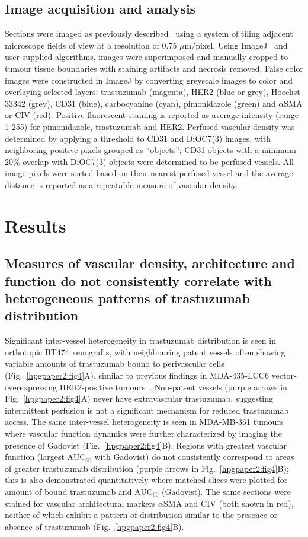 \subsection{Image acquisition and analysis}
Sections were imaged as previously described~\cite{Kyle:2007ch} using a system of tiling adjacent microscope fields of view at a resolution of 0.75 $\mu$m/pixel.
Using ImageJ~\cite{Collins:2007jr} and user-supplied algorithms, images were superimposed and manually cropped to tumour tissue boundaries with staining artifacts and necrosis removed.
False color images were constructed in ImageJ by converting greyscale images to color and overlaying selected layers: trastuzumab (magenta), \acs{HER2} (blue or grey), Hoechst 33342 (grey), CD31 (blue), carbocyanine (cyan), pimonidazole (green) and $\alpha$SMA or CIV (red).
Positive fluorescent staining is reported as average intensity (range 1-255) for pimonidazole, trastuzumab and \acs{HER2}.
Perfused vascular density was determined by applying a threshold to CD31 and DiOC7(3) images, with neighboring positive pixels grouped as ``objects''; CD31 objects with a minimum 20\% overlap with DiOC7(3) objects were determined to be perfused vessels.
All image pixels were sorted based on their nearest perfused vessel and the average distance is reported as a repeatable measure of vascular density.

\section{Results}

\subsection{Measures of vascular density, architecture and function do not consistently correlate with heterogeneous patterns of trastuzumab distribution}

Significant inter-vessel heterogeneity in trastuzumab distribution is seen in orthotopic \acs{BT474} xenografts, with neighbouring patent vessels often showing variable amounts of trastuzumab bound to perivascular cells (Fig.~\ref{hpgpaper2:fig4}A), similar to previous findings in MDA-435-LCC6 vector-overexpressing \acs{HER2}-positive tumours~\cite{Baker:2008ci}.
Non-patent vessels (purple arrows in Fig.~\ref{hpgpaper2:fig4}A) never have extravascular trastuzumab, suggesting intermittent perfusion is not a significant mechanism for reduced trastuzumab access.
The same inter-vessel heterogeneity is seen in \acs{MDA-MB-361} tumours where vascular function dynamics were further characterized by imaging the presence of Gadovist (Fig.~\ref{hpgpaper2:fig4}B).
Regions with greatest vascular function (largest \acs{AUC}$_60$ with Gadovist) do not consistently correspond to areas of greater trastuzumab distribution (purple arrows in Fig.~\ref{hpgpaper2:fig4}B); this is also demonstrated quantitatively where matched slices were plotted for amount of bound trastuzumab and \acs{AUC}$_60$ (Gadovist).
The same sections were stained for vascular architectural markers $\alpha$SMA and CIV (both shown in red), neither of which exhibit a pattern of distribution similar to the presence or absence of trastuzumab (Fig.~\ref{hpgpaper2:fig4}B).

